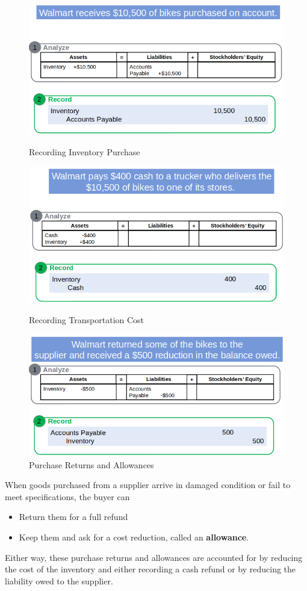 \documentclass[../main.tex]{subfiles}
\begin{document}
	\begin{figure}[ht!]
		\centering
		\includegraphics[width=1\columnwidth]{images/c7/inventory_purchases_eg.png}
		\caption{Recording Inventory Purchase}
		\includegraphics[width=1\columnwidth]{images/c7/transportation_cost_eg.png}
		\caption{Recording Transportation Cost}
		\includegraphics[width=1\columnwidth]{images/c7/purcahse_returns_allowances_eg.png}
		\caption{Purchase Returns and Allowances}
	\end{figure}
	
	When goods purchased from a supplier arrive in damaged condition or fail to 
	meet specifications, the buyer can 
	\begin{itemize}[noitemsep]
		\item Return them for a full refund 
		\item Keep them and ask for a cost reduction, called an 
		\textbf{allowance}.
	\end{itemize}
	Either way, these purchase returns and allowances are accounted for by 
	reducing the cost of the inventory and either recording a cash refund or by 
	reducing the liability owed to the supplier. 
	
\end{document}
